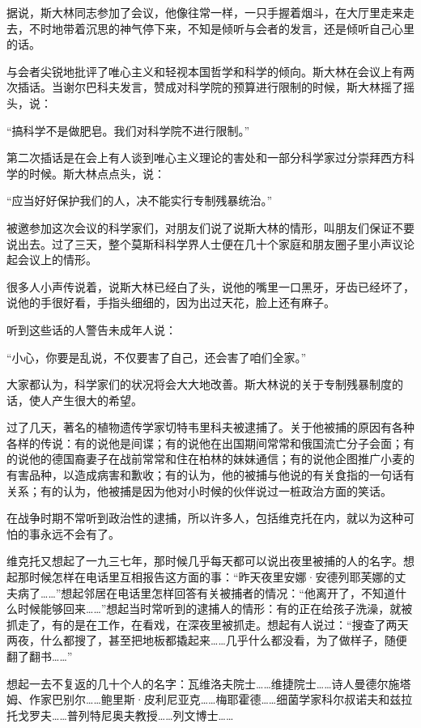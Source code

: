 据说，斯大林同志参加了会议，他像往常一样，一只手握着烟斗，在大厅里走来走去，不时地带着沉思的神气停下来，不知是倾听与会者的发言，还是倾听自己心里的话。

与会者尖锐地批评了唯心主义和轻视本国哲学和科学的倾向。斯大林在会议上有两次插话。当谢尔巴科夫发言，赞成对科学院的预算进行限制的时候，斯大林摇了摇头，说：

“搞科学不是做肥皂。我们对科学院不进行限制。”

第二次插话是在会上有人谈到唯心主义理论的害处和一部分科学家过分崇拜西方科学的时候。斯大林点点头，说：

“应当好好保护我们的人，决不能实行专制残暴统治。”

被邀参加这次会议的科学家们，对朋友们说了说斯大林的情形，叫朋友们保证不要说出去。过了三天，整个莫斯科科学界人士便在几十个家庭和朋友圈子里小声议论起会议上的情形。

很多人小声传说着，说斯大林已经白了头，说他的嘴里一口黑牙，牙齿已经坏了，说他的手很好看，手指头细细的，因为出过天花，脸上还有麻子。

听到这些话的人警告未成年人说：

“小心，你要是乱说，不仅要害了自己，还会害了咱们全家。”

大家都认为，科学家们的状况将会大大地改善。斯大林说的关于专制残暴制度的话，使人产生很大的希望。

过了几天，著名的植物遗传学家切特韦里科夫被逮捕了。关于他被捕的原因有各种各样的传说：有的说他是间谍；有的说他在出国期间常常和俄国流亡分子会面；有的说他的德国裔妻子在战前常常和住在柏林的妹妹通信；有的说他企图推广小麦的有害品种，以造成病害和歉收；有的认为，他的被捕与他说的有关食指的一句话有关系；有的认为，他被捕是因为他对小时候的伙伴说过一桩政治方面的笑话。

在战争时期不常听到政治性的逮捕，所以许多人，包括维克托在内，就以为这种可怕的事永远不会有了。

维克托又想起了一九三七年，那时候几乎每天都可以说出夜里被捕的人的名字。想起那时候怎样在电话里互相报告这方面的事：“昨天夜里安娜·安德列耶芙娜的丈夫病了……”想起邻居在电话里怎样回答有关被捕者的情况：“他离开了，不知道什么时候能够回来……”想起当时常听到的逮捕人的情形：有的正在给孩子洗澡，就被抓走了，有的是在工作，在看戏，在深夜里被抓走。想起有人说过：“搜查了两天两夜，什么都搜了，甚至把地板都撬起来……几乎什么都没看，为了做样子，随便翻了翻书……”

想起一去不复返的几十个人的名字：瓦维洛夫院士……维捷院士……诗人曼德尔施塔姆、作家巴别尔……鲍里斯·皮利尼亚克……梅耶霍德……细菌学家科尔叔诺夫和兹拉托戈罗夫……普列特尼奥夫教授……列文博士……

